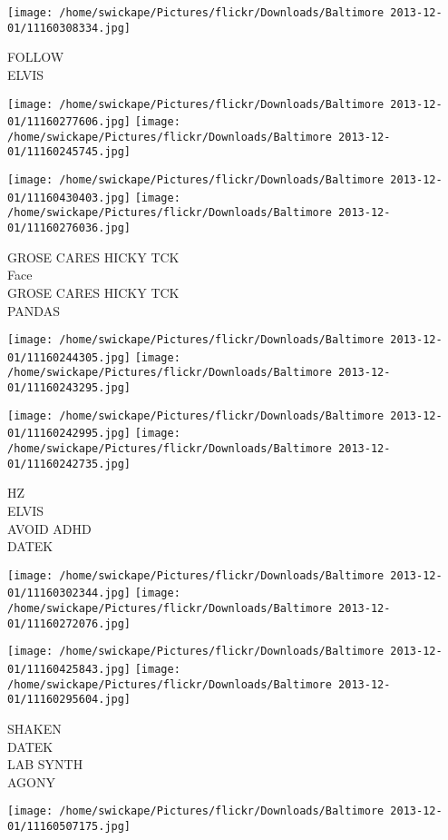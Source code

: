 \documentclass[10pt,letterpaper]{article}
\begin{document}
\vspace{0.25in}
\texttt{[image: /home/swickape/Pictures/flickr/Downloads/Baltimore 2013-12-01/11160308334.jpg]}

FOLLOW\\
ELVIS
\pagebreak

\texttt{[image: /home/swickape/Pictures/flickr/Downloads/Baltimore 2013-12-01/11160277606.jpg]}
\texttt{[image: /home/swickape/Pictures/flickr/Downloads/Baltimore 2013-12-01/11160245745.jpg]}

\texttt{[image: /home/swickape/Pictures/flickr/Downloads/Baltimore 2013-12-01/11160430403.jpg]}
\texttt{[image: /home/swickape/Pictures/flickr/Downloads/Baltimore 2013-12-01/11160276036.jpg]}

GROSE CARES HICKY TCK\\
Face\\
GROSE CARES HICKY TCK\\
PANDAS
\pagebreak

\texttt{[image: /home/swickape/Pictures/flickr/Downloads/Baltimore 2013-12-01/11160244305.jpg]}
\texttt{[image: /home/swickape/Pictures/flickr/Downloads/Baltimore 2013-12-01/11160243295.jpg]}

\texttt{[image: /home/swickape/Pictures/flickr/Downloads/Baltimore 2013-12-01/11160242995.jpg]}
\texttt{[image: /home/swickape/Pictures/flickr/Downloads/Baltimore 2013-12-01/11160242735.jpg]}

HZ\\
ELVIS\\
AVOID ADHD\\
DATEK
\pagebreak

\texttt{[image: /home/swickape/Pictures/flickr/Downloads/Baltimore 2013-12-01/11160302344.jpg]}
\texttt{[image: /home/swickape/Pictures/flickr/Downloads/Baltimore 2013-12-01/11160272076.jpg]}

\texttt{[image: /home/swickape/Pictures/flickr/Downloads/Baltimore 2013-12-01/11160425843.jpg]}
\texttt{[image: /home/swickape/Pictures/flickr/Downloads/Baltimore 2013-12-01/11160295604.jpg]}

SHAKEN\\
DATEK\\
LAB SYNTH\\
AGONY
\pagebreak

\texttt{[image: /home/swickape/Pictures/flickr/Downloads/Baltimore 2013-12-01/11160507175.jpg]}
\end{document}
